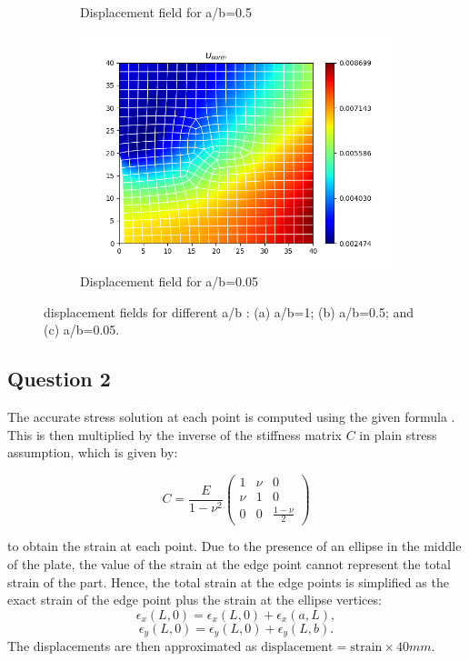 \documentclass[twoside,twocolumn,10pt]{article}
\begin{document}
\begin{figure}[!ht]
\begin{subfigure}[c]{0.32\textwidth}
    \caption{Displacement field for a/b=0.5}
    \label{fig:disp_05}
  \end{subfigure}
  \hfill
  \begin{subfigure}[c]{0.32\textwidth}
    \centering
    \includegraphics[width=1.\linewidth]{Q2_1/Q1_0.05_2_quad.png}
    \caption{Displacement field for a/b=0.05}
    \label{fig:disp_005}
  \end{subfigure}
  \caption{ displacement fields for different a/b : (a) a/b=1; (b) a/b=0.5; and (c) a/b=0.05.}
  \label{fig:disp}  
\end{figure} 

\subsection{Question 2}

The accurate stress solution at each point is computed using the given formula \cite{jin2014solution}. This is then multiplied by the inverse of the stiffness matrix \(C\) in plain stress assumption, which is given by:

\begin{equation}
C = \frac{E}{1 - \nu^2} \begin{pmatrix}
    1 & \nu & 0 \\
    \nu & 1 & 0 \\
    0 & 0 & \frac{1-\nu}{2}
\end{pmatrix}
\end{equation}

to obtain the strain at each point. Due to the presence of an ellipse in the middle of the plate, the value of the strain at the edge point cannot represent the total strain of the part. Hence, the total strain at the edge points is simplified as the exact strain of the edge point plus the strain at the ellipse vertices:
\[
\epsilon_x(L,0) = \epsilon_x(L,0) + \epsilon_x(a,L),
\]
\[
\epsilon_y(L,0) = \epsilon_y(L,0) + \epsilon_y(L,b).
\]
The displacements are then approximated as \(\text{displacement} = \text{strain} \times 40mm\).
\end{document}
